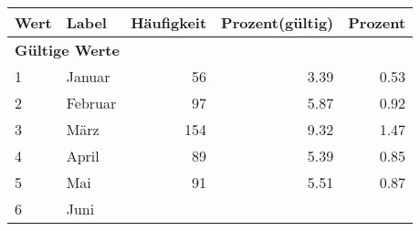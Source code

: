      \begin{longtable}{lXrrr}
     \toprule
     \textbf{Wert} & \textbf{Label} & \textbf{Häufigkeit} & \textbf{Prozent(gültig)} & \textbf{Prozent} \\
     \endhead
     \midrule
     \multicolumn{5}{l}{\textbf{Gültige Werte}}\\

     1 &
     \multicolumn{1}{X}{ Januar   } &


       \num{56} &
       \num[round-mode=places,round-precision=2]{3.39} &
         \num[round-mode=places,round-precision=2]{0.53} \\

     2 &
     \multicolumn{1}{X}{ Februar   } &


       \num{97} &
       \num[round-mode=places,round-precision=2]{5.87} &
         \num[round-mode=places,round-precision=2]{0.92} \\

     3 &
     \multicolumn{1}{X}{ März   } &


       \num{154} &
       \num[round-mode=places,round-precision=2]{9.32} &
         \num[round-mode=places,round-precision=2]{1.47} \\

     4 &
     \multicolumn{1}{X}{ April   } &


       \num{89} &
       \num[round-mode=places,round-precision=2]{5.39} &
         \num[round-mode=places,round-precision=2]{0.85} \\

     5 &
     \multicolumn{1}{X}{ Mai   } &


       \num{91} &
       \num[round-mode=places,round-precision=2]{5.51} &
         \num[round-mode=places,round-precision=2]{0.87} \\

     6 &
     \multicolumn{1}{X}{ Juni   } &



\end{longtable}
